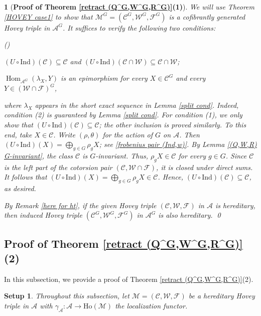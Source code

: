 \documentclass[12pt,twoside]{amsart}
\theoremstyle{bfupright head,slanted body}
\theoremstyle{bfupright head,upright body}
\newtheorem{bfhpg}[res]{}               \newtheorem*{bfhpg*}{}
\theoremstyle{fixed bf head,slanted body}
\theoremstyle{fixed bf head,upright body}
\newtheorem{setup}[res]{Setup}           \newtheorem*{setup*}{Setup}
\theoremstyle{numbered paragraph}
\newlength{\thmlistleft}        %
\newlength{\thmlistright}       %
\newlength{\thmlistpartopsep}   %
\newlength{\thmlisttopsep}      %
\newlength{\thmlistparsep}      %
\newlength{\thmlistitemsep}     %
\newcounter{rqm}
\newenvironment{rqm}{\begin{list}{\upshape (\arabic{rqm})}%
    {\usecounter{rqm}%
      \setlength{\leftmargin}{\thmlistleft}%
      \setlength{\labelwidth}{\thmlistleft}%
      \setlength{\rightmargin}{\thmlistright}%
      \setlength{\partopsep}{\thmlistpartopsep}%
      \setlength{\topsep}{\thmlisttopsep}%
      \setlength{\parsep}{\thmlistparsep}%
      \setlength{\itemsep}{\thmlistitemsep}}}%
  {\end{list}}%
\numberwithin{equation}{res}
\newcommand{\calC}{\mathcal{C}}
\newcommand{\calW}{\mathcal{W}}
\newcommand{\calF}{\mathcal{F}}
\newcommand{\calA}{\mathcal{A}}
\newcommand{\calM}{\mathcal{M}}
\newcommand{\Ind}{\mathrm{Ind}}
\newcommand{\Ho}{\mathrm{Ho}}
\newcommand{\Hom}{\operatorname{Hom}}
\begin{document}
\begin{bfhpg}[\bf Proof of Theorem \ref{retract (Q^G,W^G,R^G)}(1)]
We will use Theorem \ref{HOVEY case1} to show that $\calM^G = (\calC^G, \calW^G, \calF^G)$ is a cofibrantly generated Hovey triple in $\calA^G$.
It suffices to verify the following two conditions:
\begin{rqm}
\item
$(U \circ \Ind)(\calC) \subseteq \calC$ and $(U \circ \Ind)(\calC \cap \calW) \subseteq \calC \cap \calW$;

\item
$\Hom_{\calA^G}(\lambda_X, Y)$ is an epimorphism for every $X \in \calC^G$ and every $Y \in (\calW \cap \calF)^G$,
\end{rqm}
where $\lambda_X$ appears in the short exact sequence
in Lemma \ref{split cond}.
Indeed, condition (2) is guaranteed by Lemma \ref{split cond}.
For condition (1), we only show that $(U \circ \Ind)(\calC) \subseteq \calC$;
the other inclusion is proved similarly.
To this end, take $X \in \calC$.
Write $(\rho, \theta)$ for the action of $G$ on $\calA$.
Then $(U \circ \Ind)(X) = \bigoplus_{g \in G} \rho_g X$;
see \ref{frobenius pair (Ind,w)}.
By Lemma \ref{(Q,W,R) G-invariant}, the class $\calC$ is $G$-invariant.
Thus, $\rho_g X \in \calC$ for every $g \in G$.
Since $\calC$ is the left part of the cotorsion pair $(\calC, \calW \cap \calF)$, it is closed under direct sums.
It follows that $(U \circ \Ind)(X) = \bigoplus_{g \in G} \rho_g X \in \calC$.
Hence, $(U \circ \Ind)(\calC) \subseteq \calC$, as desired.

By Remark \ref{here for ht}, if the given Hovey triple
$(\calC, \calW, \calF)$ in $\calA$ is hereditary, then induced Hovey triple $(\calC^G, \calW^G, \calF^G)$ in $\calA^G$ is also hereditary.
\qed
\end{bfhpg}

\subsection{Proof of Theorem \ref{retract (Q^G,W^G,R^G)}(2)} \label{Thm Ho(M)G}%
\noindent
In this subsection, we provide a proof of Theorem \ref{retract (Q^G,W^G,R^G)}(2).

\begin{setup}
Throughout this subsection, let $\calM = (\calC, \calW, \calF)$ be a hereditary Hovey triple in $\calA$ with $\gamma_{\calA}: \calA \to \Ho(\calM)$ the localization functor.
\end{setup}
\end{document}
